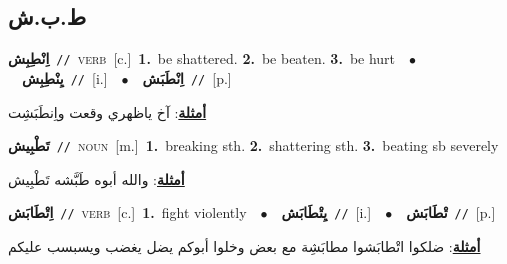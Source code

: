 \documentclass[10pt,a4paper,twoside]{article} %
\begin{document}
\begin{multicols}{2}
{{{{{{{{{{{\vspace{-3mm}
\subsection*{\color{blue}\foreignlanguage{arabic}{ط.ب.ش}\color{blue}{}} 

{\setlength\topsep{0pt}\textbf{\foreignlanguage{arabic}{اِنْطِبِش}}\ {\color{gray}\texttt{//}\color{black}}\ \textsc{verb}\ [c.]\ \textbf{1.}~be shattered.  \textbf{2.}~be beaten.  \textbf{3.}~be hurt\ \ $\bullet$\ \ \setlength\topsep{0pt}\textbf{\foreignlanguage{arabic}{يِنْطِبِش}}\ {\color{gray}\texttt{//}\color{black}}\ [i.]\ \ $\bullet$\ \ \setlength\topsep{0pt}\textbf{\foreignlanguage{arabic}{اِنْطَبَش}}\ {\color{gray}\texttt{//}\color{black}}\ [p.]\  \begin{flushright}\color{gray}\foreignlanguage{arabic}{\textbf{\underline{\foreignlanguage{arabic}{أمثلة}}}: آخ ياظهري وقعت واِنطَبَشِت}\end{flushright}\color{black}} \vspace{2mm}

{\setlength\topsep{0pt}\textbf{\foreignlanguage{arabic}{تَطْبِيش}}\ {\color{gray}\texttt{//}\color{black}}\ \textsc{noun}\ [m.]\ \textbf{1.}~breaking sth.  \textbf{2.}~shattering sth.  \textbf{3.}~beating sb severely\  \begin{flushright}\color{gray}\foreignlanguage{arabic}{\textbf{\underline{\foreignlanguage{arabic}{أمثلة}}}: والله أبوه طَبَّشه تَطْبِيش}\end{flushright}\color{black}} \vspace{2mm}

{\setlength\topsep{0pt}\textbf{\foreignlanguage{arabic}{اِتْطَابَش}}\ {\color{gray}\texttt{//}\color{black}}\ \textsc{verb}\ [c.]\ \textbf{1.}~fight violently\ \ $\bullet$\ \ \setlength\topsep{0pt}\textbf{\foreignlanguage{arabic}{يِتْطَابَش}}\ {\color{gray}\texttt{//}\color{black}}\ [i.]\ \ $\bullet$\ \ \setlength\topsep{0pt}\textbf{\foreignlanguage{arabic}{تْطَابَش}}\ {\color{gray}\texttt{//}\color{black}}\ [p.]\  \begin{flushright}\color{gray}\foreignlanguage{arabic}{\textbf{\underline{\foreignlanguage{arabic}{أمثلة}}}: ضلكوا اتْطابَشوا مطابَشِة مع بعض وخلوا أبوكم يضل يغضب ويسبسب عليكم}\end{flushright}\color{black}} \vspace{2mm}

}}}}}}}}}}}
\end{multicols}
\end{document}
